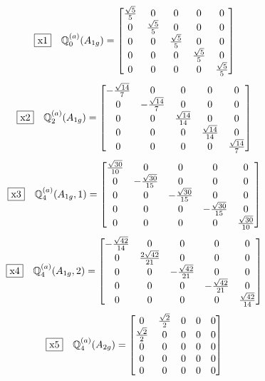 \documentclass[fleqn,10pt,landscape]{jsarticle}
\begin{document}
\begin{dmath*}
\fbox{x1}\quad \mathbb{Q}_{0}^{(a)}(A_{1g})=\begin{bmatrix} \frac{\sqrt{5}}{5} & 0 & 0 & 0 & 0 \\ 0 & \frac{\sqrt{5}}{5} & 0 & 0 & 0 \\ 0 & 0 & \frac{\sqrt{5}}{5} & 0 & 0 \\ 0 & 0 & 0 & \frac{\sqrt{5}}{5} & 0 \\ 0 & 0 & 0 & 0 & \frac{\sqrt{5}}{5} \end{bmatrix}
\end{dmath*}
\begin{dmath*}
\fbox{x2}\quad \mathbb{Q}_{2}^{(a)}(A_{1g})=\begin{bmatrix} - \frac{\sqrt{14}}{7} & 0 & 0 & 0 & 0 \\ 0 & - \frac{\sqrt{14}}{7} & 0 & 0 & 0 \\ 0 & 0 & \frac{\sqrt{14}}{14} & 0 & 0 \\ 0 & 0 & 0 & \frac{\sqrt{14}}{14} & 0 \\ 0 & 0 & 0 & 0 & \frac{\sqrt{14}}{7} \end{bmatrix}
\end{dmath*}
\begin{dmath*}
\fbox{x3}\quad \mathbb{Q}_{4}^{(a)}(A_{1g},1)=\begin{bmatrix} \frac{\sqrt{30}}{10} & 0 & 0 & 0 & 0 \\ 0 & - \frac{\sqrt{30}}{15} & 0 & 0 & 0 \\ 0 & 0 & - \frac{\sqrt{30}}{15} & 0 & 0 \\ 0 & 0 & 0 & - \frac{\sqrt{30}}{15} & 0 \\ 0 & 0 & 0 & 0 & \frac{\sqrt{30}}{10} \end{bmatrix}
\end{dmath*}
\begin{dmath*}
\fbox{x4}\quad \mathbb{Q}_{4}^{(a)}(A_{1g},2)=\begin{bmatrix} - \frac{\sqrt{42}}{14} & 0 & 0 & 0 & 0 \\ 0 & \frac{2 \sqrt{42}}{21} & 0 & 0 & 0 \\ 0 & 0 & - \frac{\sqrt{42}}{21} & 0 & 0 \\ 0 & 0 & 0 & - \frac{\sqrt{42}}{21} & 0 \\ 0 & 0 & 0 & 0 & \frac{\sqrt{42}}{14} \end{bmatrix}
\end{dmath*}
\begin{dmath*}
\fbox{x5}\quad \mathbb{Q}_{4}^{(a)}(A_{2g})=\begin{bmatrix} 0 & \frac{\sqrt{2}}{2} & 0 & 0 & 0 \\ \frac{\sqrt{2}}{2} & 0 & 0 & 0 & 0 \\ 0 & 0 & 0 & 0 & 0 \\ 0 & 0 & 0 & 0 & 0 \\ 0 & 0 & 0 & 0 & 0 \end{bmatrix}
\end{dmath*}
\end{document}
